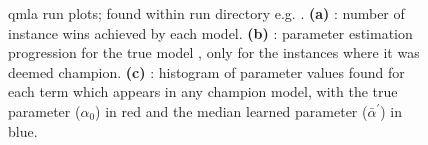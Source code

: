 \begin{figure}[H]
    \begin{center}
        \qquad
        \qquad
    \end{center}
    \caption[Run plots]{
        \gls{qmla} \gls{run} plots; found within \gls{run} directory e.g. . 
        \textbf{(a)} : number of \gls{instance} wins achieved by each model. 
        \textbf{(b)} : 
            parameter estimation progression for the  \gls{true model} , only for the \glspl{instance} where it was deemed champion. 
        \textbf{(c)} : 
            histogram of parameter values found for each term which appears in any \gls{champion model},
            with the true parameter ($\alpha_0$) in red and the median learned parameter ($\bar{\alpha}^{\prime}$) in blue.
    }
    \label{fig:run_plots}
\end{figure}

